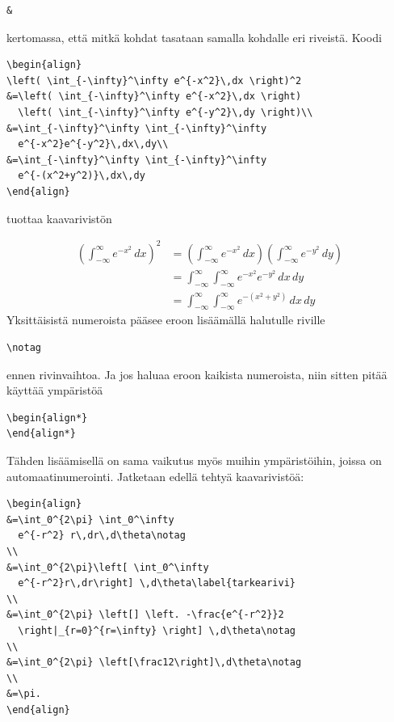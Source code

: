 \documentclass[a4paper,12 pt]{article}
\theoremstyle{plain}
\theoremstyle{definition}
\theoremstyle{remark}
\numberwithin{equation}{section}
\numberwithin{figure}{section}
\begin{document}
\begin{verbatim}
&    
\end{verbatim}
kertomassa, että mitkä kohdat tasataan samalla kohdalle eri riveistä. Koodi

\begin{verbatim}
\begin{align}
\left( \int_{-\infty}^\infty e^{-x^2}\,dx \right)^2
&=\left( \int_{-\infty}^\infty e^{-x^2}\,dx \right)
  \left( \int_{-\infty}^\infty e^{-y^2}\,dy \right)\\
&=\int_{-\infty}^\infty \int_{-\infty}^\infty
  e^{-x^2}e^{-y^2}\,dx\,dy\\
&=\int_{-\infty}^\infty \int_{-\infty}^\infty
  e^{-(x^2+y^2)}\,dx\,dy
\end{align}
\end{verbatim}
tuottaa kaavarivistön

\begin{align}
\left( \int_{-\infty}^\infty e^{-x^2}\,dx \right)^2
&=\left( \int_{-\infty}^\infty e^{-x^2}\,dx \right)
  \left( \int_{-\infty}^\infty e^{-y^2}\,dy \right)\\
&=\int_{-\infty}^\infty \int_{-\infty}^\infty
  e^{-x^2}e^{-y^2}\,dx\,dy\\
&=\int_{-\infty}^\infty \int_{-\infty}^\infty
  e^{-(x^2+y^2)}\,dx\,dy
\end{align}
Yksittäisistä numeroista pääsee eroon lisäämällä halutulle riville 

\begin{verbatim}
\notag
\end{verbatim}
ennen rivinvaihtoa. Ja jos haluaa eroon kaikista numeroista, niin sitten pitää käyttää ympäristöä

\begin{verbatim}
\begin{align*}
\end{align*}
\end{verbatim}
Tähden lisäämisellä on sama vaikutus myös muihin ympäristöihin, joissa on automaatinumerointi. Jatketaan edellä tehtyä kaavarivistöä:

\begin{verbatim}
\begin{align}
&=\int_0^{2\pi} \int_0^\infty
  e^{-r^2} r\,dr\,d\theta\notag
\\
&=\int_0^{2\pi}\left[ \int_0^\infty
  e^{-r^2}r\,dr\right] \,d\theta\label{tarkearivi}
\\
&=\int_0^{2\pi} \left[] \left. -\frac{e^{-r^2}}2
  \right|_{r=0}^{r=\infty} \right] \,d\theta\notag
\\
&=\int_0^{2\pi} \left[\frac12\right]\,d\theta\notag
\\
&=\pi.
\end{align}
\end{verbatim}
\end{document}
